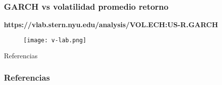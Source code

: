 \documentclass[xcolor=(list of options)]{beamer}
\begin{document}
\begin{frame}
\frametitle{GARCH vs volatilidad promedio retorno}
\textbf{https://vlab.stern.nyu.edu/analysis/VOL.ECH:US-R.GARCH}

\begin{figure}[t!]
\texttt{[image: v-lab.png]}
\end{figure}

\end{frame}


\begin{section}{Referencias}
\begin{frame}[allowframebreaks]
        \frametitle{Referencias}
        
        
\end{frame}
\end{section}

\end{document}
